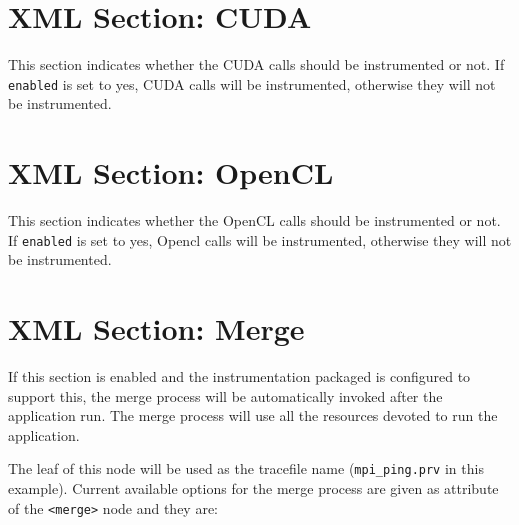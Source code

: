 \section{XML Section: CUDA}\label{sec:XMLSectionCUDA}


This section indicates whether the CUDA calls should be instrumented or not. If {\tt enabled} is set to yes, CUDA calls will be instrumented, otherwise they will not be instrumented.

\section{XML Section: OpenCL}\label{sec:XMLSectionOPENCL}


This section indicates whether the OpenCL calls should be instrumented or not. If {\tt enabled} is set to yes, Opencl calls will be instrumented, otherwise they will not be instrumented.

\section{XML Section: Merge}\label{sec:XMLSectionMerge}



If this section is enabled and the instrumentation packaged is configured to support this, the merge process will be automatically invoked after the application run. The merge process will use all the resources devoted to run the application.

The leaf of this node will be used as the tracefile name ({\tt mpi\_ping.prv} in this example). Current available options for the merge process are given as attribute of the {\tt <merge>} node and they are:

